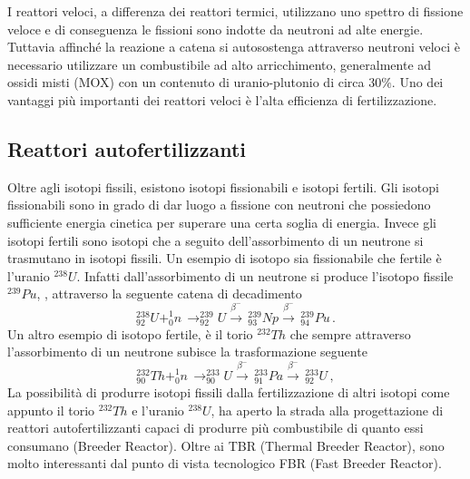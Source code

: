 I reattori veloci, a differenza dei reattori termici, utilizzano uno spettro di 
fissione veloce e di conseguenza le fissioni sono indotte da neutroni ad alte 
energie. 
Tuttavia affinché la reazione a catena si autosostenga attraverso neutroni veloci è 
necessario utilizzare un combustibile ad alto arricchimento, generalmente ad 
ossidi misti (MOX) con un contenuto di uranio-plutonio di circa 30$\%$. 
Uno dei vantaggi più importanti dei reattori veloci è l'alta efficienza di 
fertilizzazione. 
\subsection{Reattori autofertilizzanti}
Oltre agli isotopi fissili, esistono isotopi fissionabili e isotopi fertili. Gli 
isotopi fissionabili sono in grado di dar luogo a fissione con neutroni che 
possiedono sufficiente energia cinetica per superare una certa soglia di energia. Invece gli 
isotopi fertili sono isotopi che a seguito dell'assorbimento di un 
neutrone si trasmutano in isotopi fissili.
Un esempio di isotopo sia fissionabile che fertile è l'uranio $^{238}U$. 
Infatti dall'assorbimento di un neutrone si produce l'isotopo fissile $^{239}Pu$, , attraverso la seguente catena di decadimento 
\begin{equation}
\label{fertpu}
^{238}_{92}U + ^{1}_{0}n \, \longrightarrow ^{239}_{92}U  \xrightarrow{\beta^-}
 \, ^{239}_{93}Np  \xrightarrow{\beta^-} \, ^{239}_{94}Pu\,.
\end{equation}
Un altro esempio di isotopo fertile, è il torio $^{232}Th$ che sempre 
attraverso l'assorbimento di un neutrone subisce la trasformazione seguente
\begin{equation}
\label{fertth}
^{232}_{90}Th + ^{1}_{0}n \, \longrightarrow ^{233}_{90}U  \xrightarrow{\beta^-}
 \, ^{233}_{91}Pa  \xrightarrow{\beta^-} \, ^{233}_{92}U\,,
\end{equation}
La possibilità di produrre isotopi fissili dalla fertilizzazione di altri 
isotopi come appunto il torio $^{232}Th$ e l'uranio $^{238}U$, ha aperto la strada 
alla progettazione di reattori autofertilizzanti capaci di produrre più 
combustibile di quanto essi consumano (Breeder Reactor).
Oltre ai TBR (Thermal Breeder Reactor), sono molto interessanti dal punto di 
vista tecnologico FBR (Fast Breeder Reactor).

